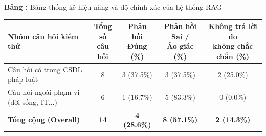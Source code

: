 \begin{table}[H]
\centering
{}
\textbf{Bảng \thetable:} Bảng thống kê hiệu năng và độ chính xác của hệ thống RAG
\label{tab:hieu_nang_do_chinh_xac}
\vspace{0.5em}
\begin{tabular}{|l|c|c|c|c|}
\hline
\textbf{Nhóm câu hỏi kiểm thử} & \makecell{\textbf{Tổng số}\\\textbf{câu hỏi}} & \makecell{\textbf{Phản hồi}\\\textbf{Đúng (\%)}} & \makecell{\textbf{Phản hồi Sai /}\\\textbf{Ảo giác (\%)}} & \makecell{\textbf{Không trả lời do}\\\textbf{không chắc chắn (\%)}} \\ \hline
Câu hỏi có trong CSDL pháp luật & 8 & 3 (37.5\%) & 3 (37.5\%) & 2 (25.0\%) \\ \hline
Câu hỏi ngoài phạm vi (đời sống, IT...) & 6 & 1 (16.7\%) & 5 (83.3\%) & 0 (0.0\%) \\ \hline
\textbf{Tổng cộng (Overall)} & \textbf{14} & \textbf{4 (28.6\%)} & \textbf{8 (57.1\%)} & \textbf{2 (14.3\%)} \\ \hline
\end{tabular}
\end{table}
